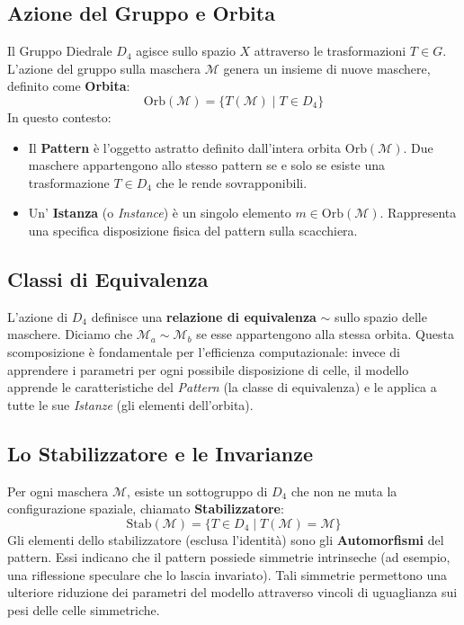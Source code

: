 \subsection{Azione del Gruppo e Orbita}
Il Gruppo Diedrale $D_4$ agisce sullo spazio $X$ attraverso le trasformazioni $T \in G$. L'azione del gruppo sulla maschera $\mathcal{M}$ genera un insieme di nuove maschere, definito come \textbf{Orbita}:
\begin{equation}
    \text{Orb}(\mathcal{M}) = \{ T(\mathcal{M}) \mid T \in D_4 \}
\end{equation}
In questo contesto:
\begin{itemize}
    \item Il \textbf{Pattern} è l'oggetto astratto definito dall'intera orbita $\text{Orb}(\mathcal{M})$. Due maschere appartengono allo stesso pattern se e solo se esiste una trasformazione $T \in D_4$ che le rende sovrapponibili.
    \item Un' \textbf{Istanza} (o \textit{Instance}) è un singolo elemento $m \in \text{Orb}(\mathcal{M})$. Rappresenta una specifica disposizione fisica del pattern sulla scacchiera.
\end{itemize}

\subsection{Classi di Equivalenza}
L'azione di $D_4$ definisce una \textbf{relazione di equivalenza} $\sim$ sullo spazio delle maschere. Diciamo che $\mathcal{M}_a \sim \mathcal{M}_b$ se esse appartengono alla stessa orbita. 
Questa scomposizione è fondamentale per l'efficienza computazionale: invece di apprendere i parametri per ogni possibile disposizione di celle, il modello apprende le caratteristiche del \textit{Pattern} (la classe di equivalenza) e le applica a tutte le sue \textit{Istanze} (gli elementi dell'orbita).

\subsection{Lo Stabilizzatore e le Invarianze}
Per ogni maschera $\mathcal{M}$, esiste un sottogruppo di $D_4$ che non ne muta la configurazione spaziale, chiamato \textbf{Stabilizzatore}:
\begin{equation}
    \text{Stab}(\mathcal{M}) = \{ T \in D_4 \mid T(\mathcal{M}) = \mathcal{M} \}
\end{equation}
Gli elementi dello stabilizzatore (esclusa l'identità) sono gli \textbf{Automorfismi} del pattern. Essi indicano che il pattern possiede simmetrie intrinseche (ad esempio, una riflessione speculare che lo lascia invariato). Tali simmetrie permettono una ulteriore riduzione dei parametri del modello attraverso vincoli di uguaglianza sui pesi delle celle simmetriche.


